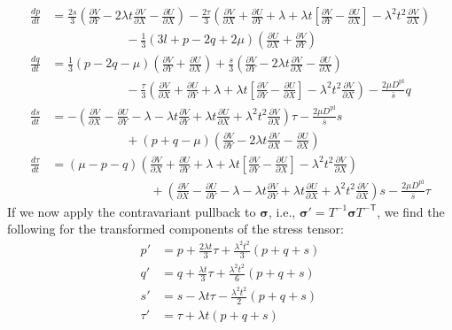 \documentclass[11pt]{article}
\newcommand{\p}{\partial}
\newcommand{\bsig}{\boldsymbol\sigma}
\newcommand{\Trans}{\mathsf{T}}
\newcommand{\Dpl}{D^\text{pl}}
\begin{document}
\begin{align}
    \frac{dp}{dt} &= \frac{2s}{3}\left(\frac{\p V}{\p Y} - 2\lambda t \frac{\p V}{\p X} - \frac{\p U}{\p X}\right) - \frac{2\tau}{3}\left(\frac{\p V}{\p X} + \frac{\p U}{\p Y} + \lambda + \lambda t\left[\frac{\p V}{\p Y} - \frac{\p U}{\p X}\right] - \lambda^2t^2\frac{\p V}{\p X}\right)\nonumber\\
    &\qquad\qquad\qquad - \frac{1}{3}(3l + p - 2q + 2\mu)\left(\frac{\p U}{\p X} + \frac{\p V}{\p Y}\right)\\
    \frac{dq}{dt} &= \frac{1}{3}\left(p - 2q - \mu\right)\left(\frac{\p V}{\p Y} + \frac{\p U}{\p X}\right) + \frac{s}{3}\left(\frac{\p V}{\p Y} - 2\lambda t \frac{\p V}{\p X} - \frac{\p U}{\p X}\right) \nonumber\\
    &\qquad\qquad\qquad - \frac{\tau}{3}\left(\frac{\p V}{\p X} + \frac{\p U}{\p Y} + \lambda + \lambda t\left[\frac{\p V}{\p Y} - \frac{\p U}{\p X}\right] - \lambda^2t^2 \frac{\p V}{\p X}\right) - \frac{2\mu\Dpl}{\bar{s}}q\\
    \frac{ds}{dt} &= -\left(\frac{\p V}{\p X} - \frac{\p U}{\p Y} - \lambda - \lambda t \frac{\p V}{\p Y} + \lambda t \frac{\p U}{\p X} + \lambda^2 t^2 \frac{\p V}{\p X}\right)\tau - \frac{2\mu \Dpl}{\bar{s}}s \nonumber\\
    &\qquad\qquad\qquad + (p + q - \mu)\left(\frac{\p V}{\p Y} - 2\lambda t \frac{\p V}{\p X} - \frac{\p U}{\p X}\right)\\
    \frac{d\tau}{dt} &= (\mu - p - q)\left(\frac{\p V}{\p X} + \frac{\p U}{\p Y} + \lambda + \lambda t\left[\frac{\p V}{\p Y} - \frac{\p U}{\p X}\right] - \lambda^2t^2 \frac{\p V}{\p X}\right) \nonumber\\
    &\qquad\qquad\qquad\qquad + \left(\frac{\p V}{\p X} - \frac{\p U}{\p Y} - \lambda - \lambda t \frac{\p V}{\p Y} + \lambda t \frac{\p U}{\p X} + \lambda^2 t^2 \frac{\p V}{\p X}\right)s - \frac{2\mu\Dpl}{\bar{s}}\tau
\end{align}
If we now apply the contravariant pullback to $\bsig$, i.e., $\bsig' = T^{-1}\bsig T^{-\Trans}$, we find the following for the transformed components of the stress tensor:
\begin{align}
    p' &= p + \frac{2\lambda t}{3}\tau + \frac{\lambda^2 t^2}{3}\left(p + q + s\right)\\
    q' &= q + \frac{\lambda t}{3}\tau + \frac{\lambda^2 t^2}{6}\left(p + q + s\right)\\
    s' &= s - \lambda t \tau - \frac{\lambda^2 t^2}{2}\left(p + q + s\right)\\
    \tau' &= \tau + \lambda t \left(p + q + s\right)
    \label{eqn:new_stresses}
\end{align}
\end{document}

